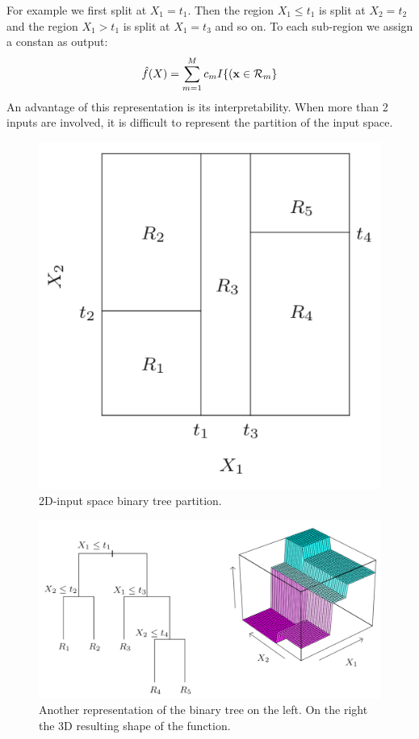 \documentclass[12pt, letterpaper]{article}
\theoremstyle{definition}
\newcommand{\x}{\mathbf{x}}
\begin{document}
For example we first split at $X_1 = t_1$. Then the region $X_1 \le t_1$ is split at $X_2 =t_2$ and the region $X_1 >t_1$ is split at $X_1 =t_3$ and so on. To each sub-region we assign a constan as output:
\begin{equation}
\hat{f}(X) = \sum_{m=1}^M c_m I\{(\x \in \CMcal{R}_m\}
\end{equation}
An advantage of this representation is its interpretability. When more than 2 inputs are involved, it is difficult to represent the partition of the input space. 
\begin{figure}
\includegraphics[scale=0.4]{img/tree1}
\caption{2D-input space binary tree partition.}
\label{tree1}
\end{figure}
\begin{figure}
\includegraphics[scale=0.39]{img/tree2}
\caption{Another representation of the binary tree on the left. On the right the 3D resulting shape of the function.}
\label{tree2}
\end{figure}
\end{document}
